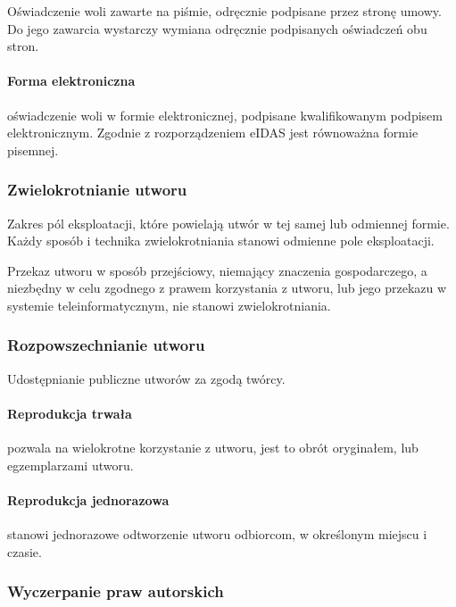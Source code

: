 \documentclass{article}
\begin{document}
Oświadczenie woli zawarte na piśmie, odręcznie podpisane przez stronę umowy. Do jego zawarcia wystarczy wymiana odręcznie podpisanych oświadczeń obu stron.

\paragraph{Forma elektroniczna}

oświadczenie woli w formie elektronicznej, podpisane kwalifikowanym podpisem elektronicznym. Zgodnie z rozporządzeniem eIDAS jest równoważna formie pisemnej.

\subsubsection{Zwielokrotnianie utworu}

Zakres pól eksploatacji, które powielają utwór w tej samej lub odmiennej formie. Każdy sposób i technika zwielokrotniania stanowi odmienne pole eksploatacji.

Przekaz utworu w sposób przejściowy, niemający znaczenia gospodarczego, a niezbędny w celu zgodnego z prawem korzystania z utworu, lub jego przekazu w systemie teleinformatycznym, nie stanowi zwielokrotniania.

\subsubsection{Rozpowszechnianie utworu}

Udostępnianie publiczne utworów za zgodą twórcy.

\paragraph{Reprodukcja trwała}

pozwala na wielokrotne korzystanie z utworu, jest to obrót oryginałem, lub egzemplarzami utworu.

\paragraph{Reprodukcja jednorazowa}

stanowi jednorazowe odtworzenie utworu odbiorcom, w określonym miejscu i czasie.

\subsubsection{Wyczerpanie praw autorskich}
\end{document}
